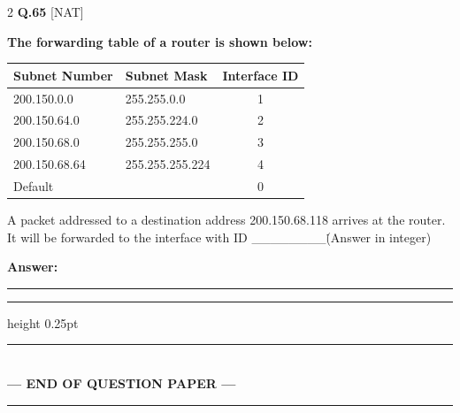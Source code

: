 \documentclass[a4paper,10pt,twoside]{article}
\begin{document}
\begin{multicols}{2}
\noindent\textbf{Q.65} \hfill {\footnotesize\textsf{[NAT]}}
\par\vspace{2pt}
{\bfseries The forwarding table of a router is shown below:
\begin{center}
\begin{tabular}{|l|l|c|}
\hline
\textbf{Subnet Number} & \textbf{Subnet Mask} & \textbf{Interface ID} \\
\hline
200.150.0.0 & 255.255.0.0 & 1 \\
200.150.64.0 & 255.255.224.0 & 2 \\
200.150.68.0 & 255.255.255.0 & 3 \\
200.150.68.64 & 255.255.255.224 & 4 \\
Default & & 0 \\
\hline
\end{tabular}
\end{center}
A packet addressed to a destination address 200.150.68.118 arrives at the router. It will be forwarded to the interface with ID \_\_\_\_\_\_\_\_\. (Answer in integer) \par}
\par\vspace{3pt}\noindent\textbf{Answer:} \rule{3.2cm}{0.4pt}
\par\vspace{6pt}\hrule height 0.25pt\vspace{6pt}
\end{multicols}
\vspace{8pt}
\begin{center}
\rule{0.35\linewidth}{0.5pt}\\[2pt]
\textbf{\small --- END OF QUESTION PAPER ---}\\[-8pt]
\rule{0.35\linewidth}{0.5pt}
\end{center}
\vspace{10pt}
\end{document}

